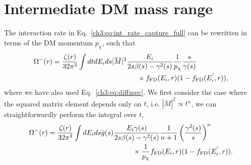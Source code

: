 \section{Intermediate DM mass range}
\label{app:sec:capratesimple}
The interaction rate in Eq.~\ref{ch3:eq:int_rate_capture_full} can be rewritten in terms of the DM momentum $p_\chi$, such that
\begin{equation} 
    \begin{split}
        \Omega^{-}(r) &= \frac{\zeta(r)}{32\pi^3}\int dt d\Ei ds |\overline{M}|^2 \frac{\Ei}{2s\beta(s)-\gamma^2(s)} \frac{1}{p_\chi}\frac{s}{\gamma(s)}\\
        &\hspace{12em}\times\fFD(\Ei,r)(1-\fFD(\Ei^{'},r)),
    \end{split}
\end{equation}
where we have also used Eq.~\ref{ch3:eq:diffxsec}. We first consider the case where the squared matrix element depends only on $t$, i.e. $|\overline{M}|^2 \propto t^n$, 
we can straightforwardly  perform the integral over $t$, 
\begin{equation}
    \begin{split}
        \Omega^{-}(r) & = \frac{\zeta(r)}{32\pi^3}\int d\Ei ds \bar{g}(s) \frac{\Ei\gamma(s)}{2s\beta(s)-\gamma^2(s)}\frac{1}{n+1}\left(\frac{\gamma^2(s)}{s}\right)^n\\
        & \hspace{12em} \times  \frac{1}{p_\chi}\fFD(\Ei,r)(1-\fFD(\Ei^{'},r)).
    \end{split}
\end{equation}

